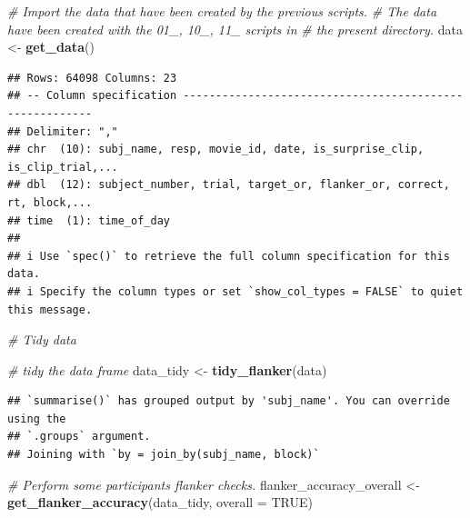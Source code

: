 \documentclass[
]{article}
\newenvironment{Shaded}{\begin{snugshade}}{\end{snugshade}}
\newcommand{\AttributeTok}[1]{\textcolor[rgb]{0.13,0.29,0.53}{#1}}
\newcommand{\CommentTok}[1]{\textcolor[rgb]{0.56,0.35,0.01}{\textit{#1}}}
\newcommand{\ConstantTok}[1]{\textcolor[rgb]{0.56,0.35,0.01}{#1}}
\newcommand{\FunctionTok}[1]{\textcolor[rgb]{0.13,0.29,0.53}{\textbf{#1}}}
\newcommand{\NormalTok}[1]{#1}
\newcommand{\OtherTok}[1]{\textcolor[rgb]{0.56,0.35,0.01}{#1}}
\begin{document}
\begin{Shaded}
\begin{Highlighting}[]
\CommentTok{\# Import the data that have been created by the previous scripts.}
\CommentTok{\# The data have been created with the 01\_, 10\_, 11\_ scripts in }
\CommentTok{\# the present directory.}
\NormalTok{data }\OtherTok{\textless{}{-}} \FunctionTok{get\_data}\NormalTok{()}
\end{Highlighting}
\end{Shaded}

\begin{verbatim}
## Rows: 64098 Columns: 23
## -- Column specification --------------------------------------------------------
## Delimiter: ","
## chr  (10): subj_name, resp, movie_id, date, is_surprise_clip, is_clip_trial,...
## dbl  (12): subject_number, trial, target_or, flanker_or, correct, rt, block,...
## time  (1): time_of_day
## 
## i Use `spec()` to retrieve the full column specification for this data.
## i Specify the column types or set `show_col_types = FALSE` to quiet this message.
\end{verbatim}

\begin{Shaded}
\begin{Highlighting}[]
\CommentTok{\# Tidy data}
\end{Highlighting}
\end{Shaded}

\begin{Shaded}
\begin{Highlighting}[]
\CommentTok{\# tidy the data frame}
\NormalTok{data\_tidy }\OtherTok{\textless{}{-}} \FunctionTok{tidy\_flanker}\NormalTok{(data)}
\end{Highlighting}
\end{Shaded}

\begin{verbatim}
## `summarise()` has grouped output by 'subj_name'. You can override using the
## `.groups` argument.
## Joining with `by = join_by(subj_name, block)`
\end{verbatim}

\begin{Shaded}
\begin{Highlighting}[]
\CommentTok{\# Perform some participants\textquotesingle{} flanker checks.}
\NormalTok{flanker\_accuracy\_overall }\OtherTok{\textless{}{-}} \FunctionTok{get\_flanker\_accuracy}\NormalTok{(data\_tidy, }\AttributeTok{overall =} \ConstantTok{TRUE}\NormalTok{)}
\end{Highlighting}
\end{Shaded}
\end{document}

